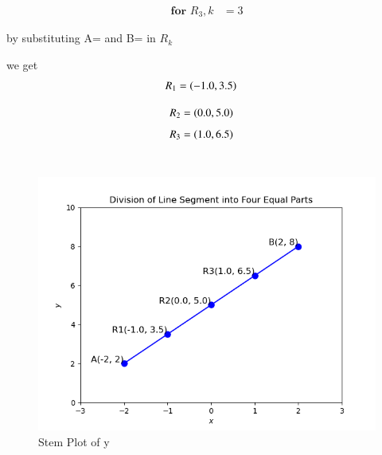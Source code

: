 \documentclass[journal]{IEEEtran}
\begin{document}
\begin{align}
\textbf{for $R_3$},k&=3
\end{align}

by substituting A= and B= in $R_k$

we get \\
\begin{align}
   R_1&=\left(-1.0,3.5\right)
\end{align}

\begin{align}
   R_2&=\left(0.0,5.0\right)
\end{align}
\begin{align}
   R_3&=\left(1.0,6.5\right)
\end{align}	\\

\begin{figure}
    \centering
    \includegraphics[width=0.5\linewidth]{Figure_1.png}
    \caption{Stem Plot of y}
    \label{stemplot}
\end{figure}
\end{document}
